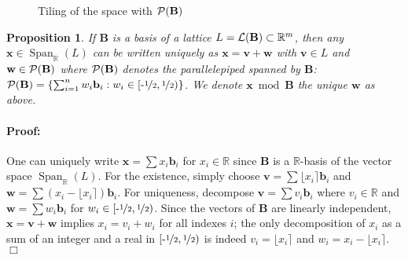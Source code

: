 \documentclass[12pt]{article}
\renewcommand{\vec}{\mathbf}
\newcommand{\R}{\mathbb R}
\newcommand{\Span}{\ensuremath{\operatorname{Span}}}
\newtheorem{proposition}[theorem]{Proposition}{\bfseries}{\upshape}
\newenvironment{proof}{\paragraph{Proof:} }{\hfill\qed\\}
\newcommand{\qed}{\hfill \ensuremath{\Box}}
\newcommand{\half}{\ensuremath{\nicefrac 1 2}}
\newcommand{\halfinterval}{\ensuremath{[\mbox{-} \half,\half)}}
\begin{document}
\begin{figure}
\caption{Tiling of the space with $\cP(\vec B)$}
\label{fig:tile}
\begin{center}
\end{center}
\end{figure}



\begin{proposition}
\label{prop:basis_fun_dom}
If $\vec B$ is a basis of a lattice $L= \cL(\vec B) \subset \R^m$, then any $\vec x \in \Span_\R(L)$ can be written
uniquely as $\vec x = \vec v + \vec w$ with $\vec v \in L$ and $\vec w \in \cP(\vec B)$ where $\cP(\vec B)$ denotes the
parallelepiped spanned by $\vec B$: $\cP(\vec B) = \{ \sum_{i=1}^n w_i \vec b_i : w_i \in \halfinterval\}$. We denote 
$\vec x \bmod \vec B$ the unique $\vec w$ as above.
\end{proposition}
\begin{proof}
One can uniquely write $\vec x = \sum x_i \vec b_i$	for $x_i \in \R$ since $\vec B$ is a $\R$-basis
of the vector space $\Span_\R(L)$. For the existence, simply choose $\vec v = \sum \lfloor x_i \rceil \vec b_i$
and $\vec w = \sum (x_i - \lfloor x_i \rceil) \vec b_i$. For uniqueness, decompose $\vec v = \sum v_i \vec b_i$
where $v_i \in \R$ and $\vec w = \sum w_i \vec b_i$ for $w_i \in \halfinterval$. Since the vectors of $\vec B$ are linearly independent,
$\vec x = \vec v + \vec w$ implies $x_i = v_i + w_i$ for all indexes $i$; the only decomposition of $x_i$ as a sum
of an integer and a real in $\halfinterval$ is indeed $v_i = \lfloor x_i \rceil$ and $w_i = x_i - \lfloor x_i \rceil$.
\end{proof}
\end{document}

